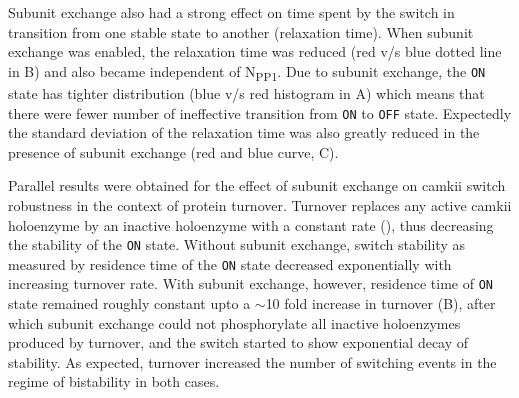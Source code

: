 \documentclass[9pt,lineno,doublespacing]{elife}
\newcommand\SUB[2]{#1\textsubscript{#2}}
\begin{document}
Subunit exchange also had a strong effect on time spent by the switch in
transition from one stable state to another (relaxation time). When subunit
exchange was enabled, the relaxation time was reduced (red v/s blue dotted line
in B) and also became independent of \SUB{N}{PP1}. Due to
subunit exchange, the \texttt{ON} state has tighter distribution (blue v/s red
histogram in A) which means that there were fewer number of
ineffective transition from \texttt{ON} to \texttt{OFF} state.  Expectedly the
standard deviation of the relaxation time was also greatly reduced in the
presence of subunit exchange (red and blue curve, C). 

Parallel results were obtained for the effect of subunit exchange on
\gls{camkii} switch robustness in the context of protein turnover.  Turnover
replaces any active \gls{camkii} holoenzyme  by an inactive holoenzyme with a
constant rate (), thus decreasing the stability of the \texttt{ON}
state. Without subunit exchange, switch stability as measured by residence time
of the \texttt{ON} state decreased exponentially with increasing turnover rate.
With subunit exchange, however, residence time of \texttt{ON} state remained
roughly constant upto a $\sim$10 fold increase in turnover (B),
after which subunit exchange could not phosphorylate all inactive holoenzymes
produced by turnover, and the switch started to show exponential decay of
stability. As expected, turnover increased the number of switching events in the
regime of bistability in both cases.
\end{document}

